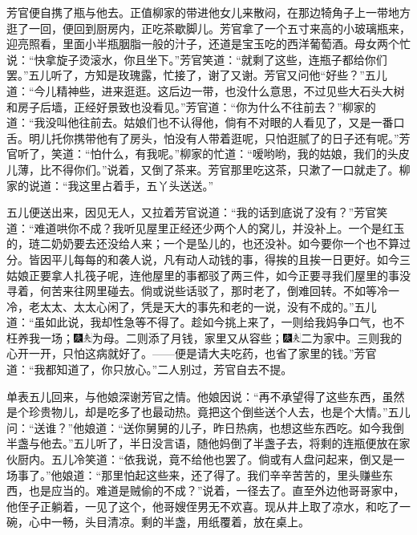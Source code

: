 芳官便自携了瓶与他去。正值柳家的带进他女儿来散闷，在那边犄角子上一带地方逛了一回，便回到厨房内，正吃茶歇脚儿。芳官拿了一个五寸来高的小玻璃瓶来，迎亮照看，里面小半瓶胭脂一般的汁子，还道是宝玉吃的西洋葡萄酒。母女两个忙说：“快拿旋子烫滚水，你且坐下。”芳官笑道：“就剩了这些，连瓶子都给你们罢。”五儿听了，方知是玫瑰露，忙接了，谢了又谢。芳官又问他“好些？”五儿道：“今儿精神些，进来逛逛。这后边一带，也没什么意思，不过见些大石头大树和房子后墙，正经好景致也没看见。”芳官道：“你为什么不往前去？”柳家的道：“我没叫他往前去。姑娘们也不认得他，倘有不对眼的人看见了，又是一番口舌。明儿托你携带他有了房头，怕没有人带着逛呢，只怕逛腻了的日子还有呢。”芳官听了，笑道：“怕什么，有我呢。”柳家的忙道：“嗳哟哟，我的姑娘，我们的头皮儿薄，比不得你们。”说着，又倒了茶来。芳官那里吃这茶，只漱了一口就走了。柳家的说道：“我这里占着手，五丫头送送。”

五儿便送出来，因见无人，又拉着芳官说道：“我的话到底说了没有？”芳官笑道：“难道哄你不成？我听见屋里正经还少两个人的窝儿，并没补上。一个是红玉的，琏二奶奶要去还没给人来；一个是坠儿的，也还没补。如今要你一个也不算过分。皆因平儿每每的和袭人说，凡有动人动钱的事，得挨的且挨一日更好。如今三姑娘正要拿人扎筏子呢，连他屋里的事都驳了两三件，如今正要寻我们屋里的事没寻着，何苦来往网里碰去。倘或说些话驳了，那时老了，倒难回转。不如等冷一冷，老太太、太太心闲了，凭是天大的事先和老的一说，没有不成的。”五儿道：“虽如此说，我却性急等不得了。趁如今挑上来了，一则给我妈争口气，也不枉养我一场；{\includegraphics[width=3mm]{../Images/00004}\includegraphics[width=3mm]{../Images/00012}\footnotesize \kaishu 为母。}二则添了月钱，家里又从容些；{\includegraphics[width=3mm]{../Images/00004}\includegraphics[width=3mm]{../Images/00012}\footnotesize \kaishu 二为家中。}三则我的心开一开，只怕这病就好了。------便是请大夫吃药，也省了家里的钱。”芳官道：“我都知道了，你只放心。”二人别过，芳官自去不提。

单表五儿回来，与他娘深谢芳官之情。他娘因说：“再不承望得了这些东西，虽然是个珍贵物儿，却是吃多了也最动热。竟把这个倒些送个人去，也是个大情。”五儿问：“送谁？”他娘道：“送你舅舅的儿子，昨日热病，也想这些东西吃。如今我倒半盏与他去。”五儿听了，半日没言语，随他妈倒了半盏子去，将剩的连瓶便放在家伙厨内。五儿冷笑道：“依我说，竟不给他也罢了。倘或有人盘问起来，倒又是一场事了。”他娘道：“那里怕起这些来，还了得了。我们辛辛苦苦的，里头赚些东西，也是应当的。难道是贼偷的不成？”说着，一径去了。直至外边他哥哥家中，他侄子正躺着，一见了这个，他哥嫂侄男无不欢喜。现从井上取了凉水，和吃了一碗，心中一畅，头目清凉。剩的半盏，用纸覆着，放在桌上。

